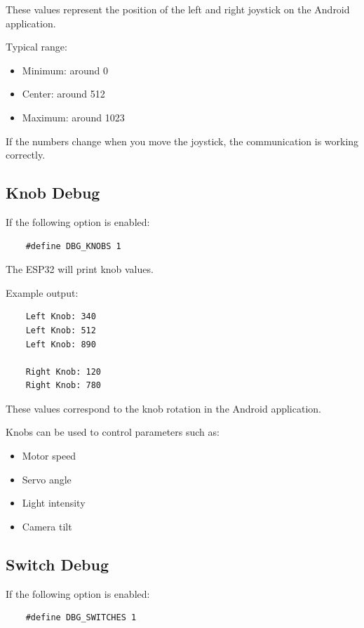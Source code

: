 These values represent the position of the left and right joystick on the Android application.

Typical range:

\begin{itemize}
	\item Minimum: around 0
	\item Center: around 512
	\item Maximum: around 1023
\end{itemize}

If the numbers change when you move the joystick, the communication is working correctly.

\subsection{Knob Debug}

If the following option is enabled:

\begin{verbatim}
	#define DBG_KNOBS 1
\end{verbatim}

The ESP32 will print knob values.

Example output:

\begin{verbatim}
	Left Knob: 340
	Left Knob: 512
	Left Knob: 890

	Right Knob: 120
	Right Knob: 780
\end{verbatim}

These values correspond to the knob rotation in the Android application.

Knobs can be used to control parameters such as:

\begin{itemize}
	\item Motor speed
	\item Servo angle
	\item Light intensity
	\item Camera tilt
\end{itemize}

\subsection{Switch Debug}

If the following option is enabled:

\begin{verbatim}
	#define DBG_SWITCHES 1
\end{verbatim}

